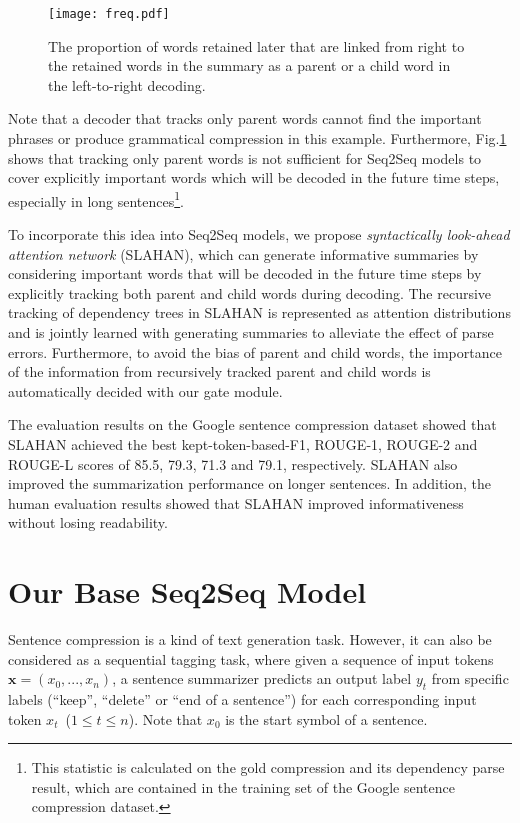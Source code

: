 \documentclass[letterpaper]{article} \usepackage{aaai20}  \usepackage{times}  \usepackage{helvet} \usepackage{courier}  \usepackage[hyphens]{url}  \usepackage{graphicx} \urlstyle{rm} \def\UrlFont{\rm}  \usepackage{graphicx}  \frenchspacing  \setlength{\pdfpagewidth}{8.5in}  \setlength{\pdfpageheight}{11in}  \usepackage{tabu}
\begin{document}
\begin{figure}[t]
    \centering
    \texttt{[image: freq.pdf]}
    \caption{The proportion of words retained later that are linked from right to the retained words in the summary as a parent or a child word in the left-to-right decoding.\label{fig:length}}
\end{figure}

Note that a decoder that tracks only parent words cannot
find the important phrases or produce grammatical compression in this example.
Furthermore, Fig.\ref{fig:length} shows that tracking only parent words is not sufficient for Seq2Seq models to cover explicitly important words which will be decoded in the future time steps, especially in long sentences\footnote{This statistic is calculated on the gold compression and its dependency parse result, which are contained in the training set of the Google sentence compression dataset.}.

To incorporate this idea into Seq2Seq models, we propose \textit{syntactically look-ahead attention network} (SLAHAN), which can generate informative summaries by considering important words that will be decoded in the future time steps by explicitly tracking both parent and child words during decoding. 
The recursive tracking of dependency trees in SLAHAN is represented as attention distributions and is jointly learned with generating summaries to alleviate the effect of parse errors.
Furthermore, to avoid the bias of parent and child words, the importance of the information from recursively tracked parent and child words is automatically decided with our gate module.

The evaluation results on the Google sentence compression
dataset showed that SLAHAN achieved the best kept-token-based-F1, ROUGE-1, ROUGE-2 and ROUGE-L scores of 85.5, 79.3, 71.3 and 79.1, respectively.
SLAHAN also improved the summarization performance on longer sentences.
In addition, the human evaluation results showed that SLAHAN improved informativeness without losing readability.

\section{Our Base Seq2Seq Model\label{sec:base}}

Sentence compression is a kind of text generation task.
However, it can also be considered as a sequential tagging task, where given a sequence of input tokens $\mathbf{x} = (x_{0}, ..., x_{n})$, a sentence summarizer predicts an output label $y_t$ from specific labels (``keep'', ``delete'' or ``end of a sentence'') for each corresponding input token $x_t$~($1\leq t\leq n$). Note that $x_{0}$ is the start symbol of a sentence.
\end{document}
